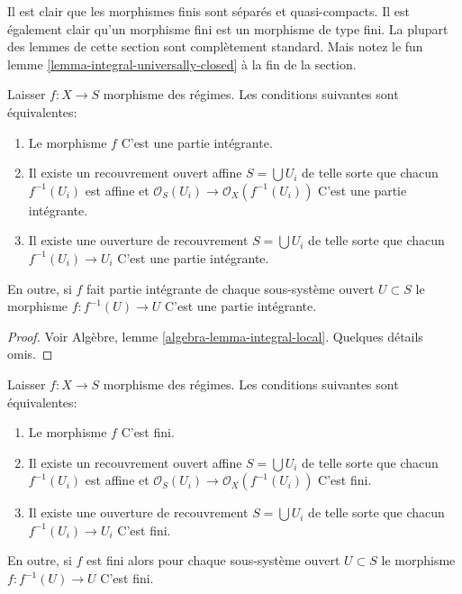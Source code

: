 \noindent
Il est clair que les morphismes finis sont séparés et quasi-compacts. Il est également clair qu'un morphisme fini est un morphisme de type fini. La plupart des lemmes de cette section sont complètement standard. Mais notez le fun lemme \ref{lemma-integral-universally-closed} à la fin de la section.

\begin{lemma}

\label{lemma-integral-local}

Laisser $f : X \to S$ morphisme des régimes. Les conditions suivantes sont équivalentes:

\begin{enumerate}

\item Le morphisme $f$ C'est une partie intégrante.
\item Il existe un recouvrement ouvert affine $S = \bigcup U_i$ de telle sorte que chacun $f^{-1}(U_i)$ est affine et
$\mathcal{O}_S(U_i) \to \mathcal{O}_X(f^{-1}(U_i))$ C'est une partie intégrante.
\item Il existe une ouverture de recouvrement $S = \bigcup U_i$
de telle sorte que chacun $f^{-1}(U_i) \to U_i$ C'est une partie intégrante.

\end{enumerate}

En outre, si $f$ fait partie intégrante de chaque sous-système ouvert
$U \subset S$ le morphisme $f : f^{-1}(U) \to U$ C'est une partie intégrante.

\end{lemma}

\begin{proof}
Voir Algèbre, lemme \ref{algebra-lemma-integral-local}. Quelques détails omis.
\end{proof}

\begin{lemma}

\label{lemma-finite-local}

Laisser $f : X \to S$ morphisme des régimes. Les conditions suivantes sont équivalentes:

\begin{enumerate}

\item Le morphisme $f$ C'est fini.
\item Il existe un recouvrement ouvert affine $S = \bigcup U_i$ de telle sorte que chacun $f^{-1}(U_i)$ est affine et
$\mathcal{O}_S(U_i) \to \mathcal{O}_X(f^{-1}(U_i))$ C'est fini.
\item Il existe une ouverture de recouvrement $S = \bigcup U_i$
de telle sorte que chacun $f^{-1}(U_i) \to U_i$ C'est fini.

\end{enumerate}

En outre, si $f$ est fini alors pour chaque sous-système ouvert
$U \subset S$ le morphisme $f : f^{-1}(U) \to U$ C'est fini.

\end{lemma}

